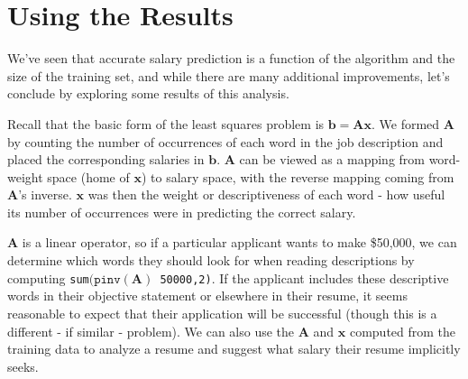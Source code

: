 \documentclass[12pt]{article}
\begin{document}
\section{Using the Results}

    We've seen that accurate salary prediction is a function of the algorithm
    and the size of the training set, and while there are many additional
    improvements, let's conclude by exploring some results of this analysis.

    Recall that the basic form of the least squares problem is $\bm{b = Ax}$.
    We formed $\bm{A}$ by counting the number of occurrences of each word in
    the job description and placed the corresponding salaries in $\bm{b}$.
    $\bm{A}$ can be viewed as a mapping from word-weight space (home of
    $\bm{x}$) to salary space, with the reverse mapping coming from $\bm{A}$'s
    inverse.  $\bm{x}$ was then the weight or descriptiveness of each word -
    how useful its number of occurrences were in predicting the correct salary.

    $\bm{A}$ is a linear operator, so if a particular applicant wants to make
    \$50,000, we can determine which words they should look for when reading
    descriptions by computing \texttt{sum$(\texttt{pinv}\bm{(A)}$ 50000,2)}.
    If the applicant includes these descriptive words in their objective
    statement or elsewhere in their resume, it seems reasonable to expect that
    their application will be successful (though this is a different - if
    similar - problem).  We can also use the $\bm{A}$ and $\bm{x}$ computed
    from the training data to analyze a resume and suggest what salary their
    resume implicitly seeks.
\end{document}
